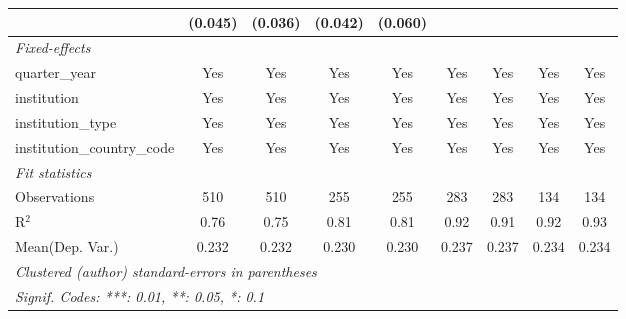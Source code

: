 \begin{tabular}{lcccccccc}
                                         & (0.045)     & (0.036) & (0.042)      & (0.060)        &           &           &           &   \\   
   \midrule
   \emph{Fixed-effects}\\
   quarter\_year                         & Yes         & Yes     & Yes          & Yes            & Yes       & Yes       & Yes       & Yes\\  
   institution                           & Yes         & Yes     & Yes          & Yes            & Yes       & Yes       & Yes       & Yes\\  
   institution\_type                     & Yes         & Yes     & Yes          & Yes            & Yes       & Yes       & Yes       & Yes\\  
   institution\_country\_code            & Yes         & Yes     & Yes          & Yes            & Yes       & Yes       & Yes       & Yes\\  
   \midrule
   \emph{Fit statistics}\\
   Observations                          & 510         & 510     & 255          & 255            & 283       & 283       & 134       & 134\\  
   R$^2$                                 & 0.76        & 0.75    & 0.81         & 0.81           & 0.92      & 0.91      & 0.92      & 0.93\\  
Mean(Dep. Var.) & 0.232 & 0.232 & 0.230 & 0.230 & 0.237 & 0.237 & 0.234 & 0.234 \\
   \midrule \midrule
   \multicolumn{9}{l}{\emph{Clustered (author) standard-errors in parentheses}}\\
   \multicolumn{9}{l}{\emph{Signif. Codes: ***: 0.01, **: 0.05, *: 0.1}}\\
\end{tabular}
\par\endgroup
